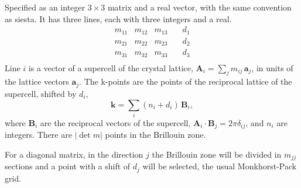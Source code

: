 \documentclass[11pt]{article}
\begin{document}
\begin{itemize}
  Specified as an integer $3 \times 3$ matrix and a real vector, with the same
  convention as {\sc siesta}.
  It has three lines, each with three integers and a real.
  \begin{equation*}
      \begin{matrix}
        m_{11}  &   m_{12}  &   m_{13}  & \quad  d_1 \\
        m_{21}  &   m_{22}  &   m_{23}  & \quad  d_2 \\
        m_{31}  &   m_{32}  &   m_{33}  & \quad  d_3 \\
      \end{matrix}
  \end{equation*}
  Line $i$ is a vector of a supercell of the crystal lattice,
  $\mathbf{A}_i = \sum_j m_{ij}\, \mathbf{a}_j$, in units of the lattice vectors
  $\mathbf{a}_j$.  The k-points are the points of the reciprocal lattice of the supercell,
  shifted by $d_i$,
  \begin{equation*}
     \mathbf{k} = \sum_i (n_i + d_i)\, \mathbf{B}_i ,
  \end{equation*}
  where $\mathbf{B}_i$ are the reciprocal vectors of the supercell,
  $\mathbf{A}_i \cdot \mathbf{B}_j = 2\pi\delta_{ij}$, and $n_i$ are integers.
  There are $|\det m|$ points in the Brillouin zone.

  For a diagonal matrix, in the direction $j$ the Brillouin zone will be divided
  in $m_{jj}$ sections and a point with a shift of $d_j$ will be selected,
  the usual Monkhorst-Pack grid.


\end{itemize}
\end{document}

